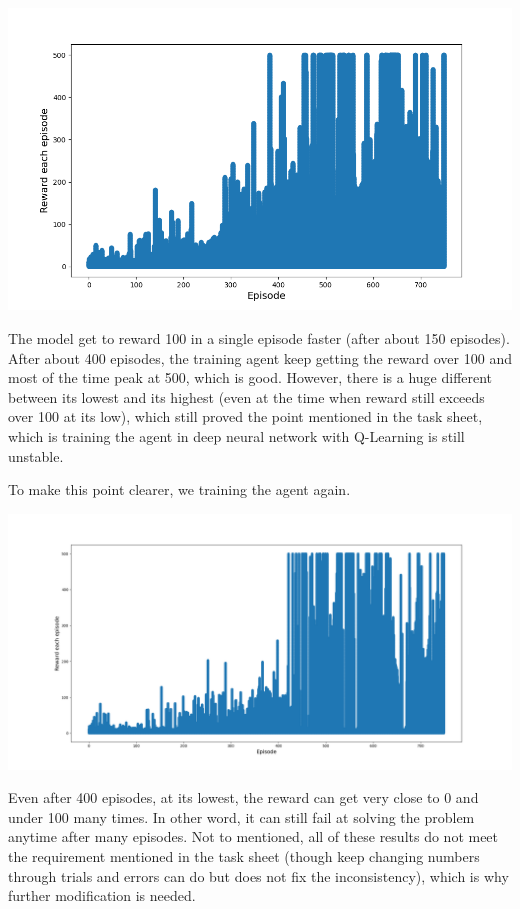 \documentclass[11pt]{article}
\begin{document}
\includegraphics[width=\textwidth,height=\textheight,keepaspectratio]{figures/dqn2.png}

The model get to reward 100 in a single episode faster (after about 150 episodes). After about 400 episodes, the training agent keep getting the reward over 100 and most of the time peak at 500, which is good. However, there is a huge different between its lowest and its highest (even at the time when reward still exceeds over 100 at its low), which still proved the point mentioned in the task sheet, which is training the agent in deep neural network with Q-Learning is still unstable.

To make this point clearer, we training the agent again.

\includegraphics[width=\textwidth,height=\textheight,keepaspectratio]{figures/dqn3.png}

Even after 400 episodes, at its lowest, the reward can get very close to 0 and under 100 many times. In other word, it can still fail at solving the problem anytime after many episodes. Not to mentioned, all of these results  do not meet the requirement mentioned in the task sheet (though keep changing numbers through trials and errors can do but does not fix the inconsistency), which is why further modification is needed.
\end{document}
